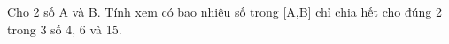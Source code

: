 Cho 2 số A và B. Tính xem có bao nhiêu số trong [A,B] chỉ chia hết cho đúng 2 trong 3 số 4, 6 và 15.  

\